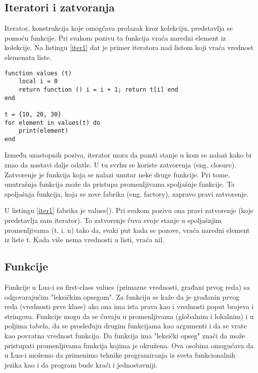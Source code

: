 \documentclass[a4paper]{article}
\begin{document}
\subsection{Iteratori i zatvoranja}

Iterator, konstrukcija koje omogćava prolazak kroz kolekciju, predstavlja se pomoću funkcije. Pri svakom pozivu ta funkcija vraća naredni element iz kolekcije. Na listingu \ref{iter1} dat je primer iteratora nad listom koji vraća vrednost elemenata liste.

\begin{lstlisting}[caption={Primer iteratora nad listom},frame=single, label=iter1]
function values (t)
	local i = 0
	return function () i = i + 1; return t[i] end
end

t = {10, 20, 30}
for element in values(t) do
	print(element)
end
\end{lstlisting}

Između uzastopnih poziva, iterator mora da pamti stanje u kom se nalazi kako bi znao da nastavi dalje odatle. U tu svrhu se koriste zatvorenja (eng. closure). Zatvorenje je funkcija koja se nalazi unutar neke druge funkcije. Pri tome, unutrašnja funkcija može da pristupa promenljivama spoljašnje funkcije. Ta spoljašnja funkcija, koja se zove fabrika (eng. factory), zapravo pravi zatvorenje. \cite{lua_org_iterators}

U listingu \ref{iter1} fabrika je values(). Pri svakom pozivu ona pravi zatvorenje (koje predstavlja sam iterator). To zatvorenje čuva svoje stanje u spoljašnjim promenljivama (t, i, n) tako da, svaki put kada se pozove, vraća naredni element iz liste t. Kada više nema vrednosti u listi, vraća nil.

\subsection{Funkcije}
Funkcije u Lua-i su first-class values (primarne vrednosti, građani prvog reda) sa odgovarajućim "leksičkim opsegom". Za funkciju se kaže da je građanin prvog reda (vrednosti prve klase) ako ona ima ista prava kao i vrednosti poput brojeva i stringova. Funkcije mogu da se čuvaju u promenljivama (globalnim i lokalnim) i u poljima tabela, da se prosleđuju drugim funkcijama kao argumenti i da se vrate kao povratna vrednost funkcija. Da funkcija ima "leksički opseg" znači da može pristupati promenljivama funkcija kojima je okružena. Ova osobina omogućava da u Lua-i možemo da primenimo tehnike programiranja iz sveta funkcionalnih jezika kao i da program bude kraći i jednostavniji.
\end{document}
